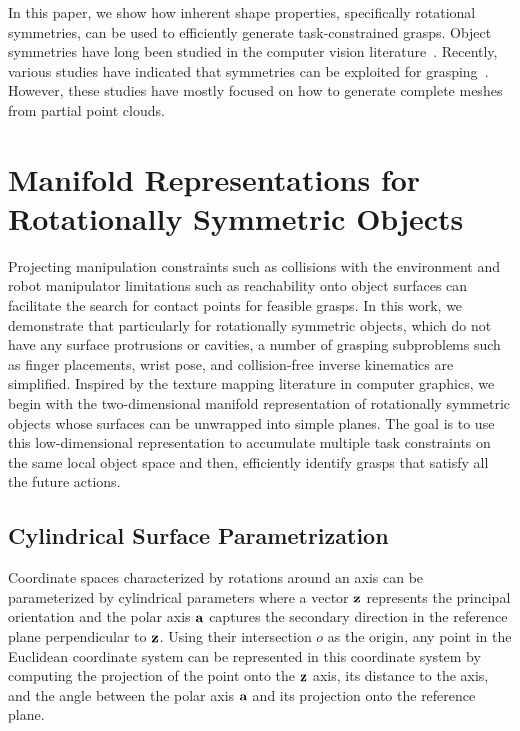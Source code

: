 \documentclass{aamas2015}
\begin{document}
In this paper, we show how inherent shape properties, specifically
rotational symmetries, can be used to efficiently generate 
task-constrained grasps. Object symmetries have long
been studied in the computer vision literature~\cite{}.
Recently, various studies have indicated that symmetries 
can be exploited for grasping~\cite{kroemer, bohg}. However, 
these studies have mostly focused on how to generate complete 
meshes from partial point clouds.

\newpage
\section{Manifold Representations for \\Rotationally Symmetric Objects}

Projecting manipulation constraints such as collisions with the environment and robot
manipulator limitations such as reachability onto object surfaces can facilitate the search
for contact points for feasible grasps. In this work, we demonstrate that particularly for rotationally
symmetric objects, which do not have any surface protrusions or cavities, a number of grasping subproblems
such as finger placements, wrist pose, and collision-free inverse kinematics are simplified. 
Inspired by the texture mapping literature in computer graphics, we begin with the two-dimensional manifold
representation of rotationally symmetric objects whose surfaces can be unwrapped
into simple planes. The goal is to use this low-dimensional representation to accumulate
multiple task constraints on the same local object space and then, efficiently identify 
grasps that satisfy all the future actions. 

\subsection{Cylindrical Surface Parametrization}

Coordinate spaces characterized by rotations around an axis can be parameterized by cylindrical
parameters where a vector $\textbf{z}$ represents the principal orientation and the polar axis
$\textbf{a}$ captures the secondary direction in the reference plane perpendicular to $\textbf{z}$. 
Using their intersection $o$ as the origin, any point in the Euclidean coordinate system can
be represented in this coordinate system by computing the projection of the point onto the
$\textbf{z}$ axis, its distance to the axis, and the angle between the polar axis $\textbf{a}$ and its
projection onto the reference plane. 
\end{document}
